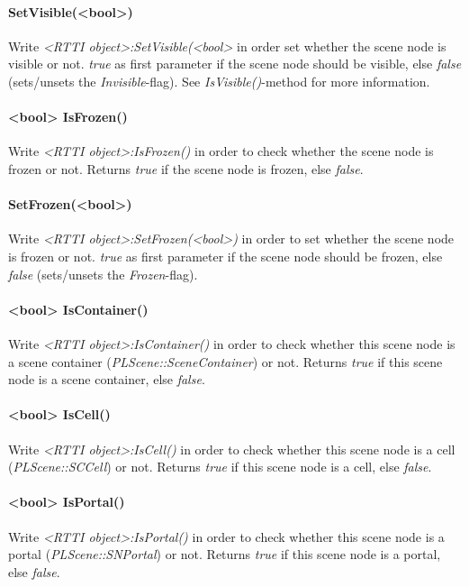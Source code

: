 \paragraph{SetVisible(<bool>)}
Write \emph{<RTTI object>:SetVisible(<bool>} in order set whether the scene node is visible or not. \emph{true} as first parameter if the scene node should be visible, else \emph{false} (sets/unsets the \emph{Invisible}-flag). See \emph{IsVisible()}-method for more information.

\paragraph{<bool> IsFrozen()}
Write \emph{<RTTI object>:IsFrozen()} in order to check whether the scene node is frozen or not. Returns \emph{true} if the scene node is frozen, else \emph{false}.

\paragraph{SetFrozen(<bool>)}
Write \emph{<RTTI object>:SetFrozen(<bool>)} in order to set whether the scene node is frozen or not. \emph{true} as first parameter if the scene node should be frozen, else \emph{false} (sets/unsets the \emph{Frozen}-flag).

\paragraph{<bool> IsContainer()}
Write \emph{<RTTI object>:IsContainer()} in order to check whether this scene node is a scene container (\emph{PLScene::SceneContainer}) or not. Returns \emph{true} if this scene node is a scene container, else \emph{false}.

\paragraph{<bool> IsCell()}
Write \emph{<RTTI object>:IsCell()} in order to check whether this scene node is a cell (\emph{PLScene::SCCell}) or not. Returns \emph{true} if this scene node is a cell, else \emph{false}.

\paragraph{<bool> IsPortal()}
Write \emph{<RTTI object>:IsPortal()} in order to check whether this scene node is a portal (\emph{PLScene::SNPortal}) or not. Returns \emph{true} if this scene node is a portal, else \emph{false}.


